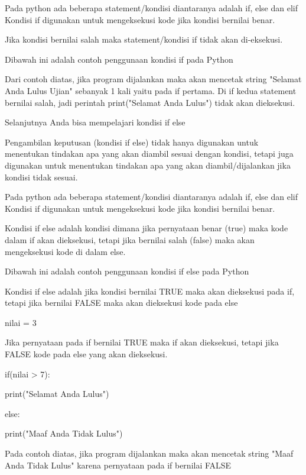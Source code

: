  
Pada python ada beberapa statement/kondisi diantaranya adalah   if,   else   dan   elif   Kondisi   if   digunakan untuk mengeksekusi kode jika kondisi bernilai benar. 
 

 
Jika kondisi bernilai salah maka statement/kondisi if tidak akan di-eksekusi. 
 

Dibawah ini adalah contoh penggunaan kondisi if pada Python 
 

Dari contoh diatas, jika program dijalankan maka akan mencetak string "Selamat Anda Lulus Ujian" sebanyak 1 kali yaitu pada if pertama. Di if kedua statement bernilai salah, jadi perintah   print("Selamat Anda Lulus")   tidak akan dieksekusi. 
 

Selanjutnya Anda bisa mempelajari kondisi if else 

 
Pengambilan keputusan (kondisi if else) tidak hanya digunakan untuk menentukan tindakan apa yang akan diambil sesuai dengan kondisi, tetapi juga digunakan untuk menentukan tindakan apa yang akan diambil/dijalankan jika kondisi tidak sesuai.

 
 
Pada python ada beberapa statement/kondisi diantaranya adalah   if,   else   dan   elif   Kondisi   if   digunakan untuk mengeksekusi kode jika kondisi bernilai benar.

 
 
Kondisi if else adalah kondisi dimana jika pernyataan benar (true) maka kode dalam if akan dieksekusi, tetapi jika bernilai salah (false) maka akan mengeksekusi kode di dalam else.

 
 
Dibawah ini adalah contoh penggunaan kondisi if else pada Python 

 
Kondisi if else adalah jika kondisi bernilai TRUE maka akan dieksekusi pada if, tetapi jika bernilai FALSE maka akan dieksekusi kode pada else 
 

nilai = 3
 
 
Jika pernyataan pada if bernilai TRUE maka if akan dieksekusi, tetapi jika FALSE kode pada else yang akan dieksekusi.
 
 
if(nilai > 7):
        
 
 print("Selamat Anda Lulus")
 
 
else:
 
 
        print("Maaf Anda Tidak Lulus") 
 


Pada contoh diatas, jika program dijalankan maka akan mencetak string "Maaf Anda Tidak Lulus" karena pernyataan pada if bernilai FALSE 
 

